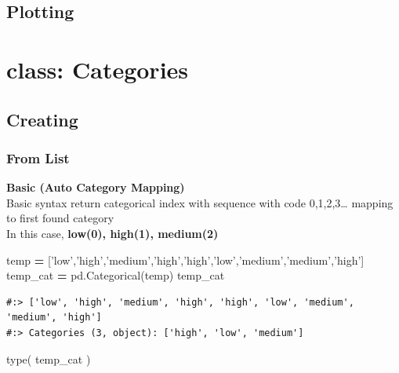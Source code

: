 \documentclass[
]{book}
\newenvironment{Shaded}{\begin{snugshade}}{\end{snugshade}}
\newcommand{\BuiltInTok}[1]{#1}
\newcommand{\NormalTok}[1]{#1}
\newcommand{\OperatorTok}[1]{\textcolor[rgb]{0.43,0.43,0.43}{\textbf{#1}}}
\newcommand{\StringTok}[1]{\textcolor[rgb]{0.5,0.5,0.5}{#1}}
\begin{document}
\hypertarget{plotting}{%
\subsection{Plotting}\label{plotting}}

\hypertarget{class-categories}{%
\section{class: Categories}\label{class-categories}}

\hypertarget{creating-2}{%
\subsection{Creating}\label{creating-2}}

\hypertarget{from-list}{%
\subsubsection{From List}\label{from-list}}

\textbf{Basic (Auto Category Mapping)}\\
Basic syntax return categorical index with sequence with code 0,1,2,3\ldots{} mapping to first found category\\
In this case, \textbf{low(0), high(1), medium(2)}

\begin{Shaded}
\begin{Highlighting}[]
\NormalTok{temp }\OperatorTok{=}\NormalTok{ [}\StringTok{'low'}\NormalTok{,}\StringTok{'high'}\NormalTok{,}\StringTok{'medium'}\NormalTok{,}\StringTok{'high'}\NormalTok{,}\StringTok{'high'}\NormalTok{,}\StringTok{'low'}\NormalTok{,}\StringTok{'medium'}\NormalTok{,}\StringTok{'medium'}\NormalTok{,}\StringTok{'high'}\NormalTok{]}
\NormalTok{temp_cat }\OperatorTok{=}\NormalTok{ pd.Categorical(temp)}
\NormalTok{temp_cat}
\end{Highlighting}
\end{Shaded}

\begin{verbatim}
#:> ['low', 'high', 'medium', 'high', 'high', 'low', 'medium', 'medium', 'high']
#:> Categories (3, object): ['high', 'low', 'medium']
\end{verbatim}

\begin{Shaded}
\begin{Highlighting}[]
\BuiltInTok{type}\NormalTok{( temp_cat )}
\end{Highlighting}
\end{Shaded}
\end{document}
